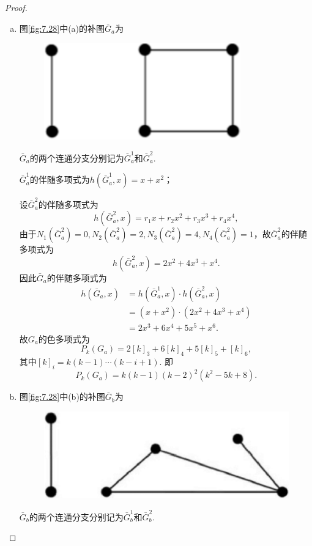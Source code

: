 \documentclass[cn,blue,normal,founder,11pt]{elegantnote}
\begin{document}
\begin{proof}
	\begin{enumerate}[(a)]
		\item 图\ref{fig:7.28}中(a)的补图\(\bar{G}_a\)为
		\begin{figure}[H]
			\centering
			\includegraphics[scale=0.65]{image/ex7.28a.pdf}
			\caption{}
			\label{fig:7.28a}
		\end{figure}
		\(\bar{G}_a\)的两个连通分支分别记为\(\bar{G}_a^1\)和\(\bar{G}_a^2\).

		\(\bar{G}_a^1\)的伴随多项式为\(h(\bar{G}_a^1,x)=x+x^2\)；

		设\(\bar{G}_a^2\)的伴随多项式为
		\[h(\bar{G}_a^2,x)=r_1x+r_2x^2+r_3x^3+r_4x^4,\]
		由于\(N_1(\bar{G}_a^2)=0,N_2(\bar{G}_a^2)=2,N_3(\bar{G}_a^2)=4,N_4(\bar{G}_a^2)=1\)，故\(\bar{G}_a^2\)的伴随多项式为
		\[h(\bar{G}_a^2,x)=2x^2+4x^3+x^4.\]
		因此\(\bar{G}_a\)的伴随多项式为
		\begin{align*}
			h(\bar{G}_a,x)&=h(\bar{G}_a^1,x)\cdot h(\bar{G}_a^2,x)\\
			&=(x+x^2)\cdot(2x^2+4x^3+x^4)\\
			&=2x^3+6x^4+5x^5+x^6.
		\end{align*}
		故\(G_a\)的色多项式为
		\[P_k(G_a)=2[k]_3+6[k]_4+5[k]_5+[k]_6,\]
		其中\([k]_i=k(k-1)\cdots(k-i+1)\). 即
		\[P_k(G_a)=k(k-1)(k-2)^2(k^2-5k+8).\]
		\item 图\ref{fig:7.28}中(b)的补图\(\bar{G}_b\)为
		\begin{figure}[H]
			\centering
			\includegraphics[scale=0.265]{image/ex7.28b.pdf}
			\caption{}
			\label{fig:4.1}
		\end{figure}
		\(\bar{G}_b\)的两个连通分支分别记为\(\bar{G}_b^1\)和\(\bar{G}_b^2\).


\end{enumerate}
\end{proof}
\end{document}
